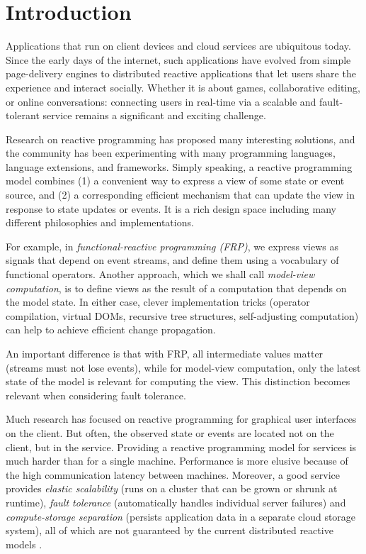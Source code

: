 \section{Introduction}

Applications that run on client devices and cloud services are ubiquitous today. Since the early days of the internet, such applications have evolved from simple page-delivery engines to distributed reactive applications that let users share the experience and interact socially. Whether it is about games, collaborative editing, or online conversations: connecting users in real-time via a scalable and fault-tolerant service remains a significant and exciting challenge.

 Research on reactive programming has proposed many interesting solutions, and the community has been experimenting with many programming languages, language extensions, and frameworks. Simply speaking, a reactive programming model combines (1) a convenient way to express a view of some state or event source, and (2) a corresponding efficient mechanism that can update the view in response to state updates or events. It is a rich design space including many different philosophies and implementations. 

For example, in \emph{functional-reactive programming (FRP)}, we express views as signals that depend on event streams, and define them using a vocabulary of functional operators. Another approach, which we shall call \emph{model-view computation}, is to define views as the result of a computation that depends on the model state. In either case, clever implementation tricks (operator compilation, virtual DOMs, recursive tree structures, self-adjusting computation) can help to achieve efficient change propagation. 

An important difference is that with FRP, all intermediate values matter (streams must not lose events), while for model-view computation, only the latest state of the model is relevant for computing the view. This distinction becomes relevant when considering fault tolerance.

 Much research has focused on reactive programming for graphical user interfaces \cite{elm, flapjax, alive} on the client. But often, the observed state or events are located not on the client, but in the service. Providing a reactive programming model for services is much harder than for a single machine. Performance is more elusive because of the high communication latency between machines. Moreover, a good service provides \emph{elastic scalability} (runs on a cluster that can be grown or shrunk at runtime),  \emph{fault tolerance} (automatically handles individual server failures) and \emph{compute-storage separation} (persists application data in a separate cloud storage system), 
all of which are not guaranteed by the current distributed reactive models \cite{drescala}.

